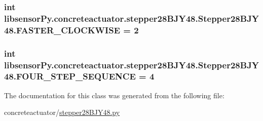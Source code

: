 \subsubsection[{F\+A\+S\+T\+E\+R\+\_\+\+C\+L\+O\+C\+K\+W\+I\+S\+E}]{\setlength{\rightskip}{0pt plus 5cm}int libsensor\+Py.\+concreteactuator.\+stepper28\+B\+J\+Y48.\+Stepper28\+B\+J\+Y48.\+F\+A\+S\+T\+E\+R\+\_\+\+C\+L\+O\+C\+K\+W\+I\+S\+E = 2\hspace{0.3cm}{\ttfamily [static]}}\label{classlibsensorPy_1_1concreteactuator_1_1stepper28BJY48_1_1Stepper28BJY48_af6651f4a535318f678bf39536773dcd8}
\hypertarget{classlibsensorPy_1_1concreteactuator_1_1stepper28BJY48_1_1Stepper28BJY48_a41c8687b2722d0aca86da571f1850abb}{}
\subsubsection[{F\+O\+U\+R\+\_\+\+S\+T\+E\+P\+\_\+\+S\+E\+Q\+U\+E\+N\+C\+E}]{\setlength{\rightskip}{0pt plus 5cm}int libsensor\+Py.\+concreteactuator.\+stepper28\+B\+J\+Y48.\+Stepper28\+B\+J\+Y48.\+F\+O\+U\+R\+\_\+\+S\+T\+E\+P\+\_\+\+S\+E\+Q\+U\+E\+N\+C\+E = 4\hspace{0.3cm}{\ttfamily [static]}}\label{classlibsensorPy_1_1concreteactuator_1_1stepper28BJY48_1_1Stepper28BJY48_a41c8687b2722d0aca86da571f1850abb}


The documentation for this class was generated from the following file\+:\begin{DoxyCompactItemize}
\item 
concreteactuator/\hyperlink{stepper28BJY48_8py}{stepper28\+B\+J\+Y48.\+py}\end{DoxyCompactItemize}
